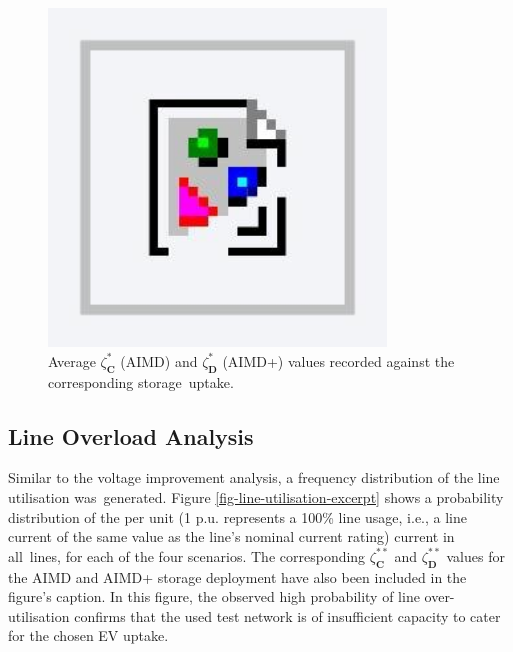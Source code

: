 \begin{figure}\centering
 \includegraphics[width=0.8\textwidth]{foo}
 \caption{Average $\zeta_\textbf{C}^{*}$ (AIMD) and $\zeta_\textbf{D}^{*}$ (AIMD+) values recorded against the corresponding storage~uptake.}
 \label{fig-voltage-AIMD-compare}
\end{figure}

\subsection{Line Overload Analysis}

Similar to the voltage improvement analysis, a frequency distribution of the line utilisation was~generated. Figure \ref{fig-line-utilisation-excerpt} shows a probability distribution of the per unit (1 p.u. represents a 100\% line usage, i.e., a line current of the same value as the line's nominal current rating) current in all~lines, for each of the four scenarios. The corresponding $\zeta_\textbf{C}^{**}$ and $\zeta_\textbf{D}^{**}$ values for the AIMD and AIMD+ storage deployment have also been included in the figure's caption. In this figure, the observed high probability of line over-utilisation confirms that the used test network is of insufficient capacity to cater for the chosen EV uptake.


